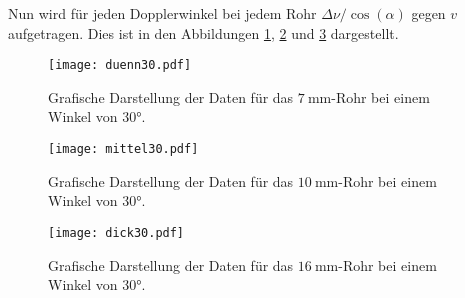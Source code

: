   \begin{table}
    \centering
    \caption{Messdaten und -ergebnisse für das $\SI{16}{\milli\metre}$-Rohr.}
    \label{tab:dick}
    \noindent{}
   \end{table}

Nun wird für jeden Dopplerwinkel bei jedem Rohr $\Delta\nu/\cos(\alpha)$ gegen $v$ aufgetragen.
Dies ist in den Abbildungen \ref{fig:duenn30}, \ref{fig:mittel30} und \ref{fig:dick30} dargestellt.

\begin{figure}
  \centering
  \texttt{[image: duenn30.pdf]}
  \caption{Grafische Darstellung der Daten für das $\SI{7}{\milli\metre}$-Rohr bei einem Winkel von 30°.}
  \label{fig:duenn30}
\end{figure}

\begin{figure}
  \centering
  \texttt{[image: mittel30.pdf]}
  \caption{Grafische Darstellung der Daten für das $\SI{10}{\milli\metre}$-Rohr bei einem Winkel von 30°.}
  \label{fig:mittel30}
\end{figure}

\begin{figure}
  \centering
  \texttt{[image: dick30.pdf]}
  \caption{Grafische Darstellung der Daten für das $\SI{16}{\milli\metre}$-Rohr bei einem Winkel von 30°.}
  \label{fig:dick30}
\end{figure}

